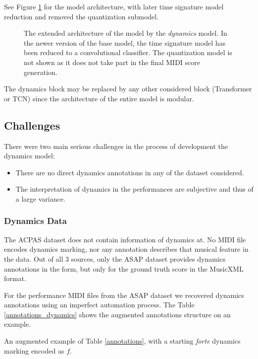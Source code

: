 See Figure \ref{model_architecture_extended} for the model architecture, with later time signature model reduction and removed the quantization submodel.

\begin{figure}[!ht]
\centering

\caption[The extended and architecture of the model.]{The extended architecture of the model by the \emph{dynamics} model. In the newer version of the base model, the time signature model has been reduced to a convolutional classifier. The quantization model is not shown as it does not take part in the final MIDI score generation.}
\label{model_architecture_extended}
\end{figure}

The dynamics block may be replaced by any other considered block (Transformer or TCN) since the architecture of the entire model is modular.

\subsection{Challenges}

There were two main serious challenges in the process of development the dynamics model: \begin{itemize}
	\item There are no direct dynamics annotations in any of the dataset considered.
	\item The interpretation of dynamics in the performances are subjective and thus of a large variance.
\end{itemize}

\subsubsection{Dynamics Data}

The ACPAS dataset does not contain information of dynamics at. No MIDI file encodes dynamics marking, nor any annotation describes that musical feature in the data. Out of all 3 sources, only the ASAP dataset provides dynamics annotations in the form, but only for the ground truth score in the MusicXML format.

For the performance MIDI files from the ASAP dataset we recovered dynamics annotations using an imperfect automation process. The Table \ref{annotations_dynamics} shows the augmented annotations structure on an example.

\begin{table}[ht!]
\centering

\caption[Dynamics TSV annotations for the ASAP dataset.]{An augmented example of Table \ref{annotations}, with a starting \emph{forte} dynamics marking encoded as $f$.}
\label{annotations_dynamics}
\end{table}

